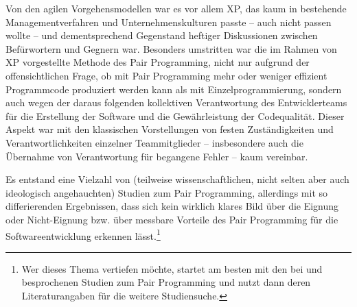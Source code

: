 \vspace{1mm} %

Von den agilen Vorgehensmodellen war es vor allem XP, das kaum in bestehende Managementverfahren und Unternehmenskulturen passte – auch nicht passen wollte – und dementsprechend Gegenstand heftiger Diskussionen zwischen Befürwortern und Gegnern war. Besonders umstritten war die im Rahmen von XP vorgestellte Methode des Pair Programming, nicht nur aufgrund der offensichtlichen Frage, ob mit Pair Programming mehr oder weniger effizient Programmcode produziert werden kann als mit Einzelprogrammierung, sondern auch wegen der daraus folgenden kollektiven Verantwortung des Entwicklerteams für die Erstellung der Software und die Gewährleistung der Codequalität. Dieser Aspekt war mit den klassischen Vorstellungen von festen Zuständigkeiten und Verantwortlichkeiten einzelner Teammitglieder – insbesondere auch die Übernahme von Verantwortung für begangene Fehler – kaum vereinbar. 

\vspace{1mm} %

Es entstand eine Vielzahl von (teilweise wissenschaftlichen, nicht selten aber auch ideologisch angehauchten) Studien zum Pair Programming, allerdings mit so differierenden Ergebnissen, dass sich kein wirklich klares Bild über die Eignung oder Nicht-Eignung bzw. über messbare Vorteile des Pair Programming für die Softwareentwicklung erkennen lässt.\footnote{Wer dieses Thema vertiefen möchte, startet am besten mit den bei \cite[99]{som18} und \cite[232]{boe04} besprochenen Studien zum Pair Programming und nutzt dann deren Literaturangaben für die weitere Studiensuche.} 

